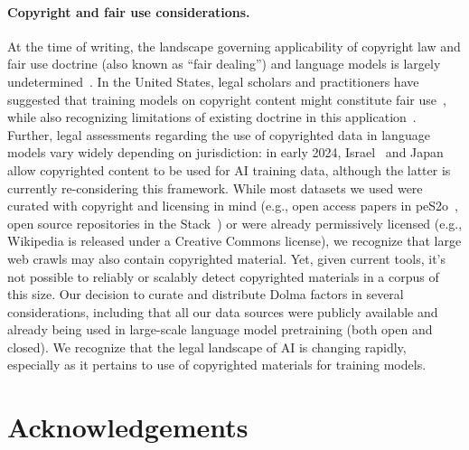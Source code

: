 \documentclass{article}
\newcommand{\dolma}{Dolma\xspace}
\begin{document}
\paragraph{Copyright and fair use considerations.} 
At the time of writing, the landscape governing applicability of copyright law and fair use doctrine (also known as ``fair dealing'') and language models is largely undetermined~\citep{Cooper2023GenerativeAILaw,Lee2023Talking}. 
In the United States, legal scholars and practitioners have suggested that training models on copyright content might constitute fair use~\citep{iSchoolUIUC2023,UCBerkeley2023,Henderson2023FoundationMA}, while also recognizing limitations of existing doctrine in this application~\citep{uspto-copyright-ai2}.
Further, legal assessments regarding the use of copyrighted data in language models vary widely depending on jurisdiction: 
in early 2024, Israel~\citep{Israel2022} and Japan~\citep{Technomancersai2023-rx} allow copyrighted content to be used for AI training data, although the latter is currently re-considering this framework.
While most datasets we used were curated with copyright and licensing in mind (e.g., open access papers in peS2o~\citep{peS2o}, open source repositories in the Stack~\citep{kocetkov2022stack}) or were already permissively licensed (e.g., Wikipedia is released under a Creative Commons license), we recognize that large web crawls may also contain copyrighted material. 
Yet, given current tools, it's not possible to reliably or scalably detect copyrighted materials in a corpus of this size.
Our decision to curate and distribute \dolma factors in several considerations, including that all our data sources were publicly available and already being used in large-scale language model pretraining (both open and closed). 
We recognize that the legal landscape of AI is changing rapidly, especially as it pertains to use of copyrighted materials for training models. 



\appendix

\section{Acknowledgements}
\label{sec:ack}
\end{document}
